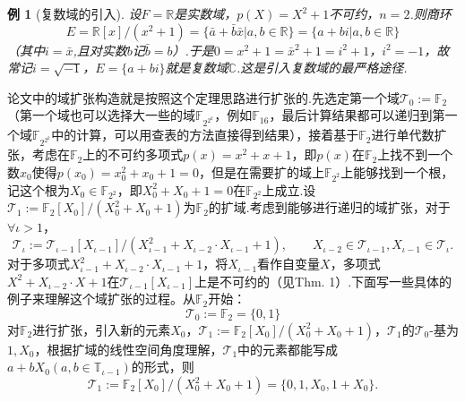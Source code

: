 \documentclass[10pt]{ctexart}
\newtheorem{example}{例}
\begin{document}
\begin{example}[复数域的引入]
    设$F=\mathbb{R}$是实数域，$p(X) = X^2 + 1$不可约，$n=2$.则商环
    \begin{displaymath}
        E = \mathbb{R}[x]/(x^2+1)=\{ \bar{a}+\bar{b}\bar{x}|a,b\in \mathbb{R} \} = \{a + bi |a,b \in \mathbb{R}\}
    \end{displaymath}
    （其中$i = \bar{x}$,且对实数$b$记$\bar{b}=b$）.于是$0=x^2+1=\bar{x}^2+1=i^2+1$，$i^2=-1$，故常记$i=\sqrt{-1}$，$E=\{a+bi\}$就是复数域$\mathbb{C}$.这是引入复数域的最严格途径.
\end{example}

论文\cite{binius}中的域扩张构造就是按照这个定理思路进行扩张的.先选定第一个域$\mathcal{T}_0 := \mathbb{F}_2$（第一个域也可以选择大一些的域$\mathbb{F}_{2^{2^k}}$，例如$\mathbb{F}_{16}$，最后计算结果都可以递归到第一个域$\mathbb{F}_{2^{2^k}}$中的计算，可以用查表的方法直接得到结果\cite{efficient-inversion-tower}），接着基于$\mathbb{F}_2$进行单代数扩张，考虑在$\mathbb{F}_2$上的不可约多项式$p(x) = x^2 + x + 1$，即$p(x)$在$\mathbb{F}_2$上找不到一个数$x_0$使得$p(x_0)=x_0^2+x_0+1=0$，但是在需要扩的域上$\mathbb{F}_{2^2}$上能够找到一个根，记这个根为$X_0 \in \mathbb{F}_{2^2}$，即$X_0^2+X_0+1 = 0$在$\mathbb{F}_{2^2}$上成立.设$\mathcal{T}_1 := \mathbb{F}_2[X_0]/(X_0^2+X_0+1)$为$\mathbb{F}_2$的扩域.考虑到能够进行递归的域扩张，对于$\forall \iota > 1$，
\begin{equation}\label{eq-extension-field}
    \mathcal{T}_{\iota} := \mathcal{T}_{\iota - 1}[X_{\iota - 1}]/ (X_{\iota - 1}^2 + X_{\iota - 2} \cdot X_{\iota - 1} + 1), \quad \quad X_{\iota - 2} \in \mathcal{T}_{\iota - 1}, X_{\iota - 1} \in \mathcal{T}_{\iota}.
\end{equation}
对于多项式$X_{\iota - 1}^2 + X_{\iota - 2} \cdot X_{\iota - 1} + 1$，将$X_{\iota - 1}$看作自变量$X$，多项式$X^2 + X_{\iota - 2} \cdot X + 1$在$\mathcal{T}_{\iota - 1}[X_{\iota - 1}]$上是不可约的（见\cite{iterated-quadratic}Thm. 1）.下面写一些具体的例子来理解这个域扩张的过程。从$\mathbb{F}_2$开始：
\begin{displaymath}
    \mathcal{T}_0 := \mathbb{F}_2 = \{0,1\}
\end{displaymath}
对$\mathbb{F}_2$进行扩张，引入新的元素$X_0$，$\mathcal{T}_1 := \mathbb{F}_2[X_0]/(X_0^2+X_0+1)$，$\mathcal{T}_1$的$\mathcal{T}_0$-基为$1, X_0$，根据扩域的线性空间角度理解，$\mathcal{T}_1$中的元素都能写成$a + b X_0 (a,b \in \mathbb{T}_{\iota - 1})$的形式，则
\begin{displaymath}
    \mathcal{T}_1 := \mathbb{F}_2[X_0]/(X_0^2+X_0+1) = \{0,1, X_0, 1 + X_0\}.
\end{displaymath}
\end{document}
